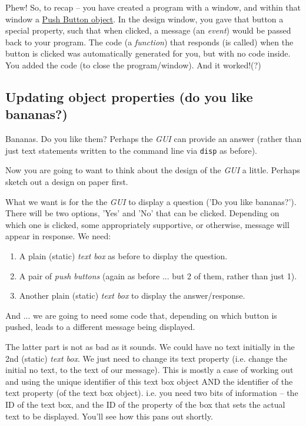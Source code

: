 \documentclass{tufte-book} %
\begin{document}
Phew! So, to recap -- you have created a program with a window, and within that window a \uline{\textsf{Push Button} object}. In the design window, you gave that button a special property, such that when clicked, a message (an \textit{event}) would be passed back to your program. The code (a \textit{function}) that responds (is called) when the button is clicked was automatically generated for you, but with no code inside. You added the code (to close the program/window). And it worked!(?)


\subsection{Updating object properties (do you like bananas?)}

Bananas. Do you like them? Perhaps the \textit{GUI} can provide an answer (rather than just text statements written  to the command line via \texttt{disp} as before).

Now you are going to want to think about the design of the \textit{GUI} a little. Perhaps sketch out a design on paper first.

What we want is for the the \textit{GUI} to display a question ('Do you like bananas?'). There will be two options, 'Yes' and 'No' that can be clicked. Depending on which one is clicked, some appropriately supportive, or otherwise, message will appear in response. We need:
\begin{enumerate}[noitemsep]
\setlength{\itemindent}{.2in}
\item A plain (static) \textit{text box} as before to display the question.
\item A pair of \textit{push buttons} (again as before ... but 2 of them, rather than just 1).
\item Another plain (static) \textit{text box} to display the answer/response.
\end{enumerate}
And ... we are going to need some code that, depending on which button is pushed, leads to a different message being displayed.

The latter part is not as bad as it sounds. We could have no text initially in the 2nd (static) \textit{text box}. We just need to change its text property (i.e. change the initial no text, to the text of our message). This is mostly a case of working out and using the unique identifier of this text box object AND the identifier of the text property (of the text box object). i.e. you need two bits of information -- the ID of the text box, and the ID of the property of the box that sets the actual text to be displayed. You'll see how this pans out shortly.
\end{document}
